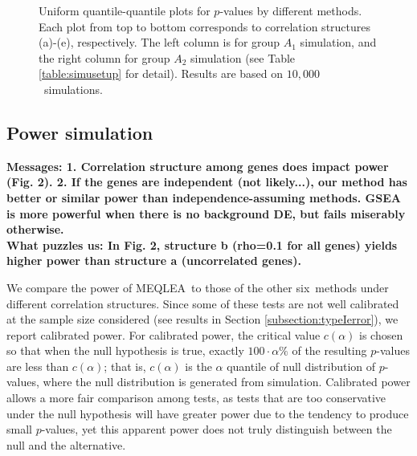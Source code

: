 \documentclass[a4,center,fleqn]{NAR}
\newcommand{\OurMethod}{MEQLEA}
\newcommand{\HowmanyTest}{six}
\newcommand{\aaCase}{a}
\newcommand{\fCase}{e}
\newcommand{\HowmanySimu}{$10,000$}
\begin{document}
\begin{figure}[!ht]
\begin{center}
		\end{center} 
		\caption{Uniform quantile-quantile plots for $p$-values by different methods. Each plot from top to
			bottom corresponds to correlation structures (\aaCase)-(\fCase), respectively. The left column is
			for group $A_1$ simulation, and the right column for group $A_2$ simulation (see Table
			\ref{table:simusetup} for detail). Results are based on
			\HowmanySimu~simulations.}\label{fig:typeIerror}
	\end{figure} 
	
	
	\subsection{Power simulation}\label{subsection:power}		 
	
\textbf{	Messages: 1. Correlation structure among genes does impact power (Fig. 2). 2. If the genes are independent (not likely...), our method has better or similar power than independence-assuming methods. GSEA is more powerful when there is no background DE, but fails miserably otherwise. \\
	What puzzles us: In Fig. 2, structure b (rho=0.1 for all genes) yields higher power than structure a (uncorrelated genes).}
	
	
	We compare the power of \OurMethod~to those of the other \HowmanyTest~methods under different
	correlation structures. Since some of these tests are not well calibrated at the sample size
	considered (see results in Section \ref{subsection:typeIerror}), we report calibrated power. For
	calibrated power, the critical value $c(\alpha)$ is chosen so that when the null hypothesis is true,
	exactly $100\cdot\alpha\%$ of the resulting $p$-values are less than $c(\alpha)$; that is,
	$c(\alpha)$ is  the $\alpha$ quantile of null distribution of $p$-values, where the null
	distribution is generated from simulation. Calibrated power allows a more fair comparison among
	tests, as tests that are too conservative under the null hypothesis will have greater power due to
	the tendency to produce small $p$-values, yet this apparent power does not truly distinguish between
	the null and the alternative.  
	
\end{document}
